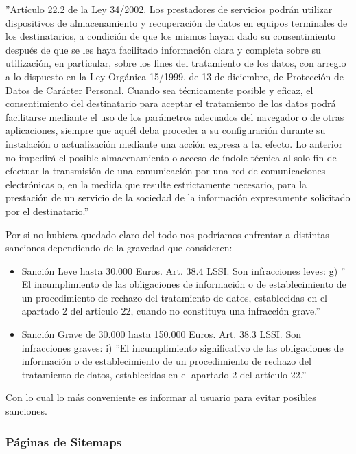 ''Artículo 22.2 de la Ley 34/2002. Los prestadores de servicios podrán utilizar dispositivos de almacenamiento y recuperación de datos en equipos terminales de los destinatarios, a condición de que los mismos hayan dado su consentimiento después de que se les haya facilitado información clara y completa sobre su utilización, en particular, sobre los fines del tratamiento de los datos, con arreglo a lo dispuesto en la Ley Orgánica 15/1999, de 13 de diciembre, de Protección de Datos de Carácter Personal. Cuando sea técnicamente posible y eficaz, el consentimiento del destinatario para aceptar el tratamiento de los datos podrá facilitarse mediante el uso de los parámetros adecuados del navegador o de otras aplicaciones, siempre que aquél deba proceder a su configuración durante su instalación o actualización mediante una acción expresa a tal efecto. Lo anterior no impedirá el posible almacenamiento o acceso de índole técnica al solo fin de efectuar la transmisión de una comunicación por una red de comunicaciones electrónicas o, en la medida que resulte estrictamente necesario, para la prestación de un servicio de la sociedad de la información expresamente solicitado por el destinatario.''


Por si no hubiera quedado claro del todo nos podríamos enfrentar a distintas sanciones dependiendo de la gravedad que consideren:


\begin{itemize}
\item Sanción Leve hasta 30.000 Euros.  Art. 38.4 LSSI. Son infracciones leves:
g) '' El incumplimiento de las obligaciones de información o de establecimiento de un procedimiento de rechazo del tratamiento de datos, establecidas en el apartado 2 del artículo 22, cuando no constituya una infracción grave.''
\item Sanción Grave de 30.000 hasta 150.000 Euros. Art. 38.3 LSSI. Son infracciones graves:
i) ''El incumplimiento significativo de las obligaciones de información o de establecimiento de un procedimiento de rechazo del tratamiento de datos, establecidas en el apartado 2 del artículo 22.''
\end{itemize}


Con lo cual lo más conveniente es informar al usuario para evitar posibles sanciones.
 

\subsubsection{Páginas de Sitemaps}
\label{subsubsec:sitemap}



